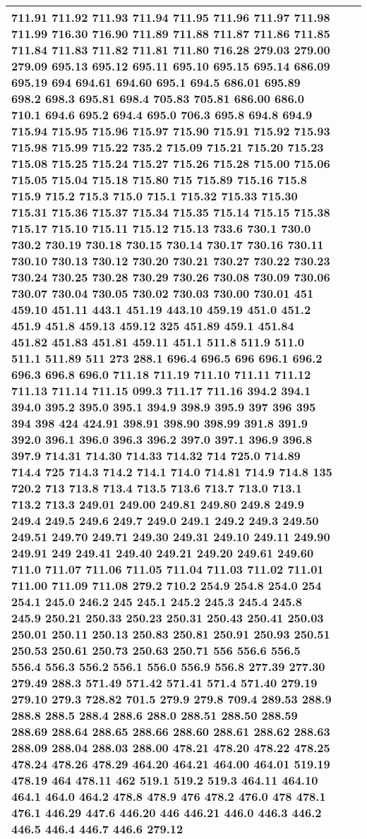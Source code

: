 \begin{longtable}{|L{.1in}|L{.6in}||L{5.65in}|}
711.91 711.92 711.93 711.94 711.95 711.96 711.97 711.98 711.99 716.30 716.90 711.89 711.88 711.87 711.86 711.85 711.84 711.83 711.82 711.81 711.80 716.28 279.03 279.00 279.09 695.13 695.12 695.11 695.10 695.15 695.14 686.09 695.19 694 694.61 694.60 695.1 694.5 686.01 695.89 698.2 698.3 695.81 698.4 705.83 705.81 686.00 686.0 710.1 694.6 695.2 694.4 695.0 706.3 695.8 694.8 694.9 715.94 715.95 715.96 715.97 715.90 715.91 715.92 715.93 715.98 715.99 715.22 735.2 715.09 715.21 715.20 715.23 715.08 715.25 715.24 715.27 715.26 715.28 715.00 715.06 715.05 715.04 715.18 715.80 715 715.89 715.16 715.8 715.9 715.2 715.3 715.0 715.1 715.32 715.33 715.30 715.31 715.36 715.37 715.34 715.35 715.14 715.15 715.38 715.17 715.10 715.11 715.12 715.13 733.6 730.1 730.0 730.2 730.19 730.18 730.15 730.14 730.17 730.16 730.11 730.10 730.13 730.12 730.20 730.21 730.27 730.22 730.23 730.24 730.25 730.28 730.29 730.26 730.08 730.09 730.06 730.07 730.04 730.05 730.02 730.03 730.00 730.01 451 459.10 451.11 443.1 451.19 443.10 459.19 451.0 451.2 451.9 451.8 459.13 459.12 325 451.89 459.1 451.84 451.82 451.83 451.81 459.11 451.1 511.8 511.9 511.0 511.1 511.89 511 273 288.1 696.4 696.5 696 696.1 696.2 696.3 696.8 696.0 711.18 711.19 711.10 711.11 711.12 711.13 711.14 711.15 099.3 711.17 711.16 394.2 394.1 394.0 395.2 395.0 395.1 394.9 398.9 395.9 397 396 395 394 398 424 424.91 398.91 398.90 398.99 391.8 391.9 392.0 396.1 396.0 396.3 396.2 397.0 397.1 396.9 396.8 397.9 714.31 714.30 714.33 714.32 714 725.0 714.89 714.4 725 714.3 714.2 714.1 714.0 714.81 714.9 714.8 135 720.2 713 713.8 713.4 713.5 713.6 713.7 713.0 713.1 713.2 713.3 249.01 249.00 249.81 249.80 249.8 249.9 249.4 249.5 249.6 249.7 249.0 249.1 249.2 249.3 249.50 249.51 249.70 249.71 249.30 249.31 249.10 249.11 249.90 249.91 249 249.41 249.40 249.21 249.20 249.61 249.60 711.0 711.07 711.06 711.05 711.04 711.03 711.02 711.01 711.00 711.09 711.08 279.2 710.2 254.9 254.8 254.0 254 254.1 245.0 246.2 245 245.1 245.2 245.3 245.4 245.8 245.9 250.21 250.33 250.23 250.31 250.43 250.41 250.03 250.01 250.11 250.13 250.83 250.81 250.91 250.93 250.51 250.53 250.61 250.73 250.63 250.71 556 556.6 556.5 556.4 556.3 556.2 556.1 556.0 556.9 556.8 277.39 277.30 279.49 288.3 571.49 571.42 571.41 571.4 571.40 279.19 279.10 279.3 728.82 701.5 279.9 279.8 709.4 289.53 288.9 288.8 288.5 288.4 288.6 288.0 288.51 288.50 288.59 288.69 288.64 288.65 288.66 288.60 288.61 288.62 288.63 288.09 288.04 288.03 288.00 478.21 478.20 478.22 478.25 478.24 478.26 478.29 464.20 464.21 464.00 464.01 519.19 478.19 464 478.11 462 519.1 519.2 519.3 464.11 464.10 464.1 464.0 464.2 478.8 478.9 476 478.2 476.0 478 478.1 476.1 446.29 447.6 446.20 446 446.21 446.0 446.3 446.2 446.5 446.4 446.7 446.6 279.12\\\hline

\end{longtable}
